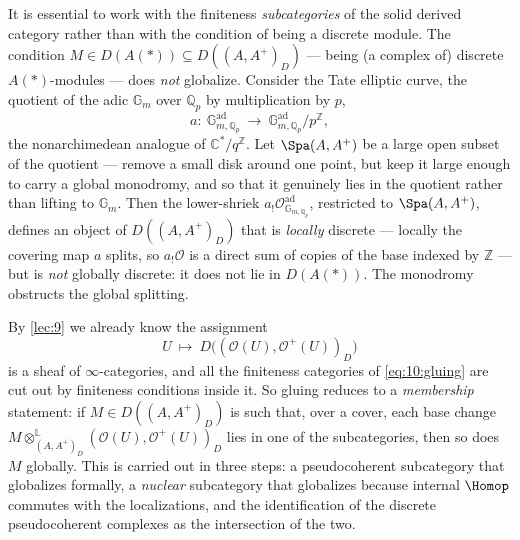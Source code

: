 \begin{remark}
\label{rmk:10:warning}
It is essential to work with the finiteness \emph{subcategories} of the solid
derived category rather than with the condition of being a discrete module. The
condition $M\in D(A(\ast))\subseteq D((A,A^{+})_{D})$ --- being (a complex of)
discrete $A(\ast)$-modules --- does \emph{not} globalize.
Consider the Tate elliptic curve, the quotient of the adic $\mathbb{G}_{m}$ over
$\mathbb{Q}_{p}$ by multiplication by $p$,
\begin{equation*}
a\colon\ \mathbb{G}_{m,\mathbb{Q}_p}^{\mathrm{ad}}\ \longrightarrow\
\mathbb{G}_{m,\mathbb{Q}_p}^{\mathrm{ad}}/p^{\mathbb{Z}},
\end{equation*}
the nonarchimedean analogue of $\mathbb{C}^{*}/q^{\mathbb{Z}}$. Let
$\Spa(A,A^{+})$ be a large open subset of the quotient --- remove a small disk
around one point, but keep it large enough to carry a global monodromy, and so
that it genuinely lies in the quotient rather than lifting to
$\mathbb{G}_{m}$. Then the lower-shriek $a_{!}\mathcal O^{\mathrm{ad}}_{\mathbb{G}_{m,\mathbb{Q}_p}}$,
restricted to $\Spa(A,A^{+})$, defines an object of $D((A,A^{+})_{D})$ that is
\emph{locally} discrete --- locally the covering map $a$ splits, so
$a_{!}\mathcal O$ is a direct sum of copies of the base indexed by
$\mathbb{Z}$ --- but is \emph{not} globally discrete: it does not lie in
$D(A(\ast))$. The monodromy obstructs the global splitting.
\end{remark}

\begin{remark}
\label{rmk:10:outline}
By \cref{lec:9} we already know the assignment
\begin{equation*}
U\ \longmapsto\ D\bigl((\mathcal O(U),\mathcal O^{+}(U))_{D}\bigr)
\end{equation*}
is a sheaf of $\infty$-categories, and all the finiteness categories of
\eqref{eq:10:gluing} are cut out by finiteness conditions inside it. So gluing
reduces to a \emph{membership} statement: if $M\in D((A,A^{+})_{D})$ is such that,
over a cover, each base change
$M\otimes^{\mathbb{L}}_{(A,A^{+})_{D}}(\mathcal O(U),\mathcal O^{+}(U))_{D}$ lies
in one of the subcategories, then so does $M$ globally. This is carried out in
three steps: a pseudocoherent subcategory that globalizes formally, a
\emph{nuclear} subcategory that globalizes because internal $\Homop$ commutes with
the localizations, and the identification of the discrete pseudocoherent complexes
as the intersection of the two.
\end{remark}

